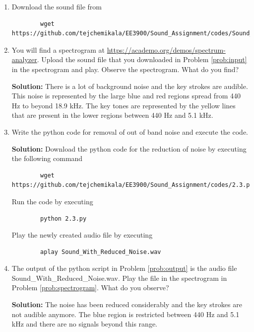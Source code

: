 \documentclass[journal,12pt,twocolumn]{IEEEtran}
\newcommand{\solution}{\noindent \textbf{Solution: }}
\numberwithin{equation}{section}
\renewcommand\thesection{\arabic{section}}
\begin{document}
	\begin{enumerate}[label=\thesection.\arabic*,ref=\thesection.\theenumi]
	\item \label{prob:input} Download the sound file from  
	\begin{lstlisting}
		wget https://github.com/tejchemikala/EE3900/Sound_Assignment/codes/Sound_Noise.wav
	\end{lstlisting}
	
	\item \label{prob:spectrogram} You will find a spectrogram at \href{https://academo.org/demos/spectrum-analyzer}{\url{https://academo.org/demos/spectrum-analyzer}}. Upload the sound file that you downloaded in Problem \ref{prob:input} in the spectrogram  and play.  Observe the spectrogram. What do you find?
	
	\solution There is a lot of background noise and the key strokes are audible. This noise is represented by the large blue and red regions spread from 440 Hz to beyond 18.9 kHz. The key tones are represented by the yellow lines that are present in the lower regions between 440 Hz and 5.1 kHz.
	
	\item \label{prob:output} Write the python code for removal of out of band noise and execute the code. 
	
	\solution Download the python code for the reduction of noise by executing the following command
	\begin{lstlisting}
		wget https://github.com/tejchemikala/EE3900/Sound_Assignment/codes/2.3.py
	\end{lstlisting}
	
	Run the code by executing
	\begin{lstlisting}
		python 2.3.py
	\end{lstlisting}
	
	Play the newly created audio file by executing
	\begin{lstlisting}
		aplay Sound_With_Reduced_Noise.wav
	\end{lstlisting}
	
	\item The output of the python script in Problem \ref{prob:output} is the audio file Sound\_With\_Reduced\_Noise.wav. Play the file in the spectrogram in Problem \ref{prob:spectrogram}. What do you observe?
	
	\solution The noise has been reduced considerably and the key strokes are not audible anymore. The blue region is restricted between 440 Hz and 5.1 kHz and there are no signals beyond this range.
	
	
	\end{enumerate}
	
\end{document}
